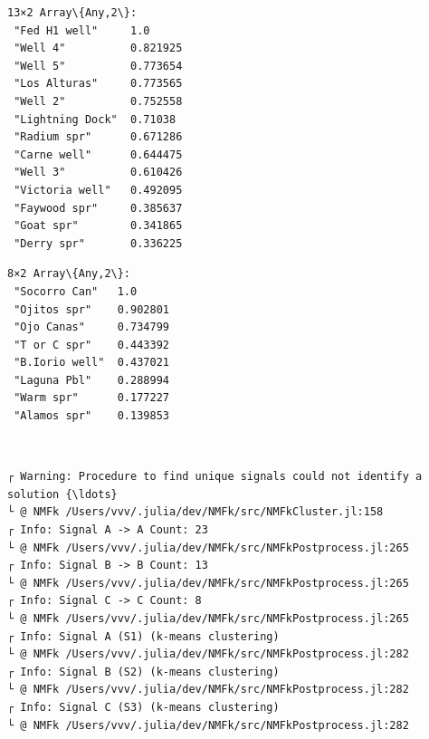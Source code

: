 \documentclass[11pt]{article}
\begin{document}
    
    
    \begin{Verbatim}[commandchars=\\\{\}]
13×2 Array\{Any,2\}:
 "Fed H1 well"     1.0
 "Well 4"          0.821925
 "Well 5"          0.773654
 "Los Alturas"     0.773565
 "Well 2"          0.752558
 "Lightning Dock"  0.71038
 "Radium spr"      0.671286
 "Carne well"      0.644475
 "Well 3"          0.610426
 "Victoria well"   0.492095
 "Faywood spr"     0.385637
 "Goat spr"        0.341865
 "Derry spr"       0.336225
    \end{Verbatim}

    
    
    \begin{Verbatim}[commandchars=\\\{\}]
8×2 Array\{Any,2\}:
 "Socorro Can"   1.0
 "Ojitos spr"    0.902801
 "Ojo Canas"     0.734799
 "T or C spr"    0.443392
 "B.Iorio well"  0.437021
 "Laguna Pbl"    0.288994
 "Warm spr"      0.177227
 "Alamos spr"    0.139853
    \end{Verbatim}

    
    \begin{center}
    \end{center}
    { \hspace*{\fill} \\}
    
    \begin{Verbatim}[commandchars=\\\{\}]
┌ Warning: Procedure to find unique signals could not identify a solution {\ldots}
└ @ NMFk /Users/vvv/.julia/dev/NMFk/src/NMFkCluster.jl:158
┌ Info: Signal A -> A Count: 23
└ @ NMFk /Users/vvv/.julia/dev/NMFk/src/NMFkPostprocess.jl:265
┌ Info: Signal B -> B Count: 13
└ @ NMFk /Users/vvv/.julia/dev/NMFk/src/NMFkPostprocess.jl:265
┌ Info: Signal C -> C Count: 8
└ @ NMFk /Users/vvv/.julia/dev/NMFk/src/NMFkPostprocess.jl:265
┌ Info: Signal A (S1) (k-means clustering)
└ @ NMFk /Users/vvv/.julia/dev/NMFk/src/NMFkPostprocess.jl:282
┌ Info: Signal B (S2) (k-means clustering)
└ @ NMFk /Users/vvv/.julia/dev/NMFk/src/NMFkPostprocess.jl:282
┌ Info: Signal C (S3) (k-means clustering)
└ @ NMFk /Users/vvv/.julia/dev/NMFk/src/NMFkPostprocess.jl:282
    \end{Verbatim}

    \begin{center}
    \end{center}
    { \hspace*{\fill} \\}
    
\end{document}
